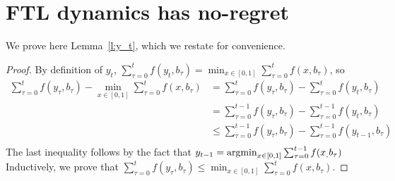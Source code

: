 \section{FTL dynamics has no-regret}\label{app:s:fictitious_noregret}
We prove here Lemma~\ref{l:y_t}, which we restate for
convenience.
\begin{proof}By definition of $y_t$,
  $\sum_{\tau=0}^t f(y_t,b_\tau)=\min_{ x \in [0,1]} \sum_{\tau=0}^t f(x,b_\tau)$, so
  \begin{align*}
    \sum_{\tau=0}^t f(y_\tau,b_\tau) - \min_{ x \in [0,1]} \sum_{\tau=0}^t f(x,b_\tau) &=
    \sum_{\tau=0}^t f(y_\tau,b_\tau) - \sum_{\tau=0}^t f(y_t,b_\tau)\\
    &= \sum_{\tau=0}^{t-1} f(y_\tau,b_\tau) - \sum_{\tau=0}^{t-1} f(y_t,b_\tau)\\
    &\leq \sum_{\tau=0}^{t-1} f(y_\tau,b_\tau) - \sum_{\tau=0}^{t-1} f(y_{t-1},b_\tau)\\
  \end{align*}
  The last inequality follows by the fact that $y_{t-1} = \operatorname*{argmin}_{x \in [0,1]}\sum_{\tau=0}^{t-1}f(x_,b_\tau)$
  Inductively, we prove that $\sum_{\tau=0}^t f(y_\tau,b_\tau) \leq \min_{ x \in [0,1]} \sum_{\tau=0}^t f(x,b_\tau)$.
\end{proof}

